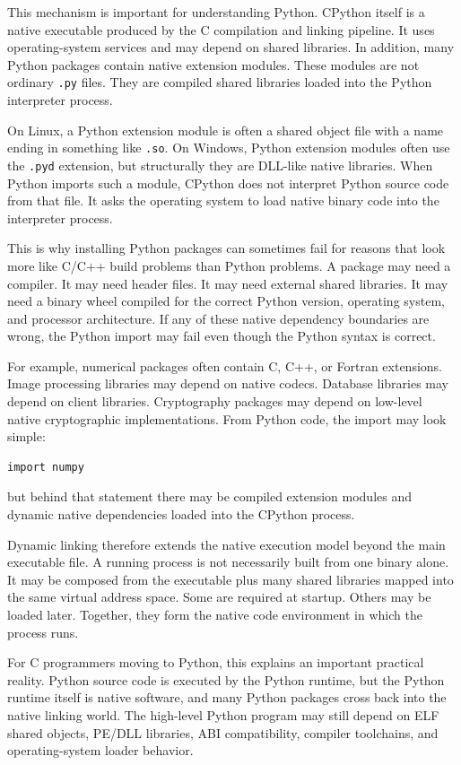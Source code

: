 This mechanism is important for understanding Python. CPython itself is a native executable produced by the C compilation and linking pipeline. It uses operating-system services and may depend on shared libraries. In addition, many Python packages contain native extension modules. These modules are not ordinary \texttt{.py} files. They are compiled shared libraries loaded into the Python interpreter process.

On Linux, a Python extension module is often a shared object file with a name ending in something like \texttt{.so}. On Windows, Python extension modules often use the \texttt{.pyd} extension, but structurally they are DLL-like native libraries. When Python imports such a module, CPython does not interpret Python source code from that file. It asks the operating system to load native binary code into the interpreter process.

This is why installing Python packages can sometimes fail for reasons that look more like C/C++ build problems than Python problems. A package may need a compiler. It may need header files. It may need external shared libraries. It may need a binary wheel compiled for the correct Python version, operating system, and processor architecture. If any of these native dependency boundaries are wrong, the Python import may fail even though the Python syntax is correct.

For example, numerical packages often contain C, C++, or Fortran extensions. Image processing libraries may depend on native codecs. Database libraries may depend on client libraries. Cryptography packages may depend on low-level native cryptographic implementations. From Python code, the import may look simple:

\begin{verbatim}
import numpy
\end{verbatim}

but behind that statement there may be compiled extension modules and dynamic native dependencies loaded into the CPython process.

Dynamic linking therefore extends the native execution model beyond the main executable file. A running process is not necessarily built from one binary alone. It may be composed from the executable plus many shared libraries mapped into the same virtual address space. Some are required at startup. Others may be loaded later. Together, they form the native code environment in which the process runs.

For C programmers moving to Python, this explains an important practical reality. Python source code is executed by the Python runtime, but the Python runtime itself is native software, and many Python packages cross back into the native linking world. The high-level Python program may still depend on ELF shared objects, PE/DLL libraries, ABI compatibility, compiler toolchains, and operating-system loader behavior.


